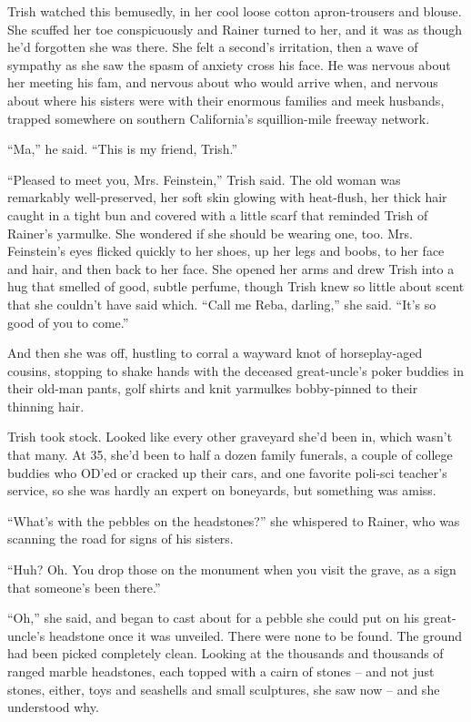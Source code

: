 Trish watched this bemusedly, in her cool loose cotton apron-trousers 
and blouse. She scuffed her toe conspicuously and Rainer turned to her, 
and it was as though he'd forgotten she was there. She felt a second's 
irritation, then a wave of sympathy as she saw the spasm of anxiety 
cross his face. He was nervous about her meeting his fam, and nervous 
about who would arrive when, and nervous about where his sisters were 
with their enormous families and meek husbands, trapped somewhere on 
southern California's squillion-mile freeway network.

“Ma,” he said. “This is my friend, Trish.”

“Pleased to meet you, Mrs. Feinstein,” Trish said. The old woman 
was remarkably well-preserved, her soft skin glowing with heat-flush, 
her thick hair caught in a tight bun and covered with a little scarf 
that reminded Trish of Rainer's yarmulke. She wondered if she should be 
wearing one, too. Mrs. Feinstein's eyes flicked quickly to her shoes, 
up her legs and boobs, to her face and hair, and then back to her face. 
She opened her arms and drew Trish into a hug that smelled of good, 
subtle perfume, though Trish knew so little about scent that she 
couldn't have said which. “Call me Reba, darling,” she said. 
“It's so good of you to come.”

And then she was off, hustling to corral a wayward knot of 
horse\-play-aged cousins, stopping to shake hands with the deceased 
great-uncle's poker buddies in their old-man pants, golf shirts and 
knit yarmulkes bobby-pinned to their thinning hair.

Trish took stock. Looked like every other graveyard she'd been in, 
which wasn't that many. At 35, she'd been to half a dozen family 
funerals, a couple of college buddies who OD'ed or cracked up their 
cars, and one favorite poli-sci teacher's service, so she was hardly an 
expert on boneyards, but something was amiss.

“What's with the pebbles on the headstones?” she whispered to 
Rainer, who was scanning the road for signs of his sisters.

“Huh? Oh. You drop those on the monument when you visit the grave, as 
a sign that someone's been there.”

“Oh,” she said, and began to cast about for a pebble she could put 
on his great-uncle's headstone once it was unveiled. There were none to 
be found. The ground had been picked completely clean. Looking at the 
thousands and thousands of ranged marble headstones, each topped with a 
cairn of stones -- and not just stones, either, toys and seashells and 
small sculptures, she saw now -- and she understood why.


